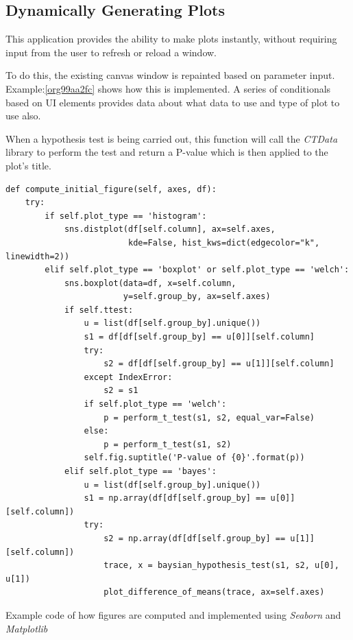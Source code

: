 \documentclass[11pt]{report}
\begin{document}
\subsection{Dynamically Generating Plots}
\label{sec:org9a763fd}
This application provides the ability to make plots instantly, without requiring input from the user to refresh or reload a window.

To do this, the existing canvas window is repainted based on parameter input. Example:\ref{org99aa2fc}
shows how this is implemented. A series of conditionals based on UI elements provides data about what data to use and type of plot to use also.

When a hypothesis test is being carried out, this function will call the \emph{CTData} library to perform the test and return a P-value which is then applied to the plot's title.

\begin{listing}[htbp]
\begin{verbatim}
def compute_initial_figure(self, axes, df):
    try:
        if self.plot_type == 'histogram':
            sns.distplot(df[self.column], ax=self.axes,
                         kde=False, hist_kws=dict(edgecolor="k", linewidth=2))
        elif self.plot_type == 'boxplot' or self.plot_type == 'welch':
            sns.boxplot(data=df, x=self.column,
                        y=self.group_by, ax=self.axes)
            if self.ttest:
                u = list(df[self.group_by].unique())
                s1 = df[df[self.group_by] == u[0]][self.column]
                try:
                    s2 = df[df[self.group_by] == u[1]][self.column]
                except IndexError:
                    s2 = s1
                if self.plot_type == 'welch':
                    p = perform_t_test(s1, s2, equal_var=False)
                else:
                    p = perform_t_test(s1, s2)
                self.fig.suptitle('P-value of {0}'.format(p))
            elif self.plot_type == 'bayes':
                u = list(df[self.group_by].unique())
                s1 = np.array(df[df[self.group_by] == u[0]][self.column])
                try:
                    s2 = np.array(df[df[self.group_by] == u[1]][self.column])
                    trace, x = baysian_hypothesis_test(s1, s2, u[0], u[1])
                    plot_difference_of_means(trace, ax=self.axes)
\end{verbatim}
\caption{\label{org99aa2fc}
Example code of how figures are computed and implemented using \emph{Seaborn} and \emph{Matplotlib}}
\end{listing}
\end{document}
